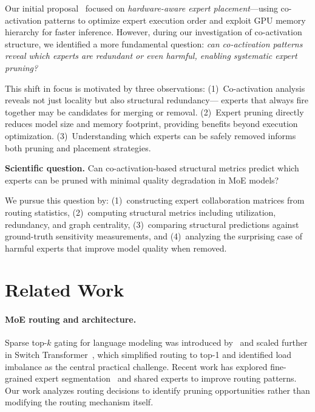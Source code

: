 \documentclass{article}
\begin{document}
Our initial proposal~\citep{luo2025occult} focused on \emph{hardware-aware expert
placement}---using co-activation patterns to optimize expert execution order and
exploit GPU memory hierarchy for faster inference.
However, during our investigation of co-activation structure, we identified a more
fundamental question: \emph{can co-activation patterns reveal which experts are
redundant or even harmful, enabling systematic expert pruning?}

This shift in focus is motivated by three observations:
(1)~Co-activation analysis reveals not just locality but also structural redundancy---
experts that always fire together may be candidates for merging or removal.
(2)~Expert pruning directly reduces model size and memory footprint, providing
benefits beyond execution optimization.
(3)~Understanding which experts can be safely removed informs both pruning and
placement strategies.

\textbf{Scientific question.}
Can co-activation-based structural metrics predict which experts can be pruned
with minimal quality degradation in MoE models?

We pursue this question by: (1)~constructing expert collaboration matrices from
routing statistics, (2)~computing structural metrics including utilization,
redundancy, and graph centrality, (3)~comparing structural predictions against
ground-truth sensitivity measurements, and (4)~analyzing the surprising case of
harmful experts that improve model quality when removed.

\section{Related Work}

\paragraph{MoE routing and architecture.}
Sparse top-$k$ gating for language modeling was introduced by~\citet{shazeer2017outrageously}
and scaled further in Switch Transformer~\citep{fedus2022switch}, which simplified
routing to top-1 and identified load imbalance as the central practical challenge.
Recent work has explored fine-grained expert segmentation~\citep{deepseek2024} and
shared experts to improve routing patterns.
Our work analyzes routing decisions to identify pruning opportunities rather than
modifying the routing mechanism itself.
\end{document}
